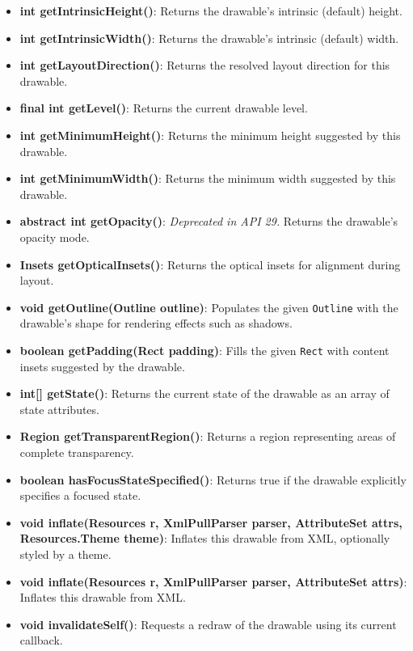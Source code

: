 \documentclass{report}
\begin{document}
\begin{itemize}
\begin{itemize}
                \item \textbf{int getIntrinsicHeight()}: Returns the drawable’s intrinsic (default) height.
                \item \textbf{int getIntrinsicWidth()}: Returns the drawable’s intrinsic (default) width.
                \item \textbf{int getLayoutDirection()}: Returns the resolved layout direction for this drawable.
                \item \textbf{final int getLevel()}: Returns the current drawable level.
                \item \textbf{int getMinimumHeight()}: Returns the minimum height suggested by this drawable.
                \item \textbf{int getMinimumWidth()}: Returns the minimum width suggested by this drawable.
                \item \textbf{abstract int getOpacity()}: \textit{Deprecated in API 29.} Returns the drawable’s opacity mode.
                \item \textbf{Insets getOpticalInsets()}: Returns the optical insets for alignment during layout.
                \item \textbf{void getOutline(Outline outline)}: Populates the given \texttt{Outline} with the drawable’s shape for rendering effects such as shadows.
                \item \textbf{boolean getPadding(Rect padding)}: Fills the given \texttt{Rect} with content insets suggested by the drawable.
                \item \textbf{int[] getState()}: Returns the current state of the drawable as an array of state attributes.
                \item \textbf{Region getTransparentRegion()}: Returns a region representing areas of complete transparency.
                \item \textbf{boolean hasFocusStateSpecified()}: Returns true if the drawable explicitly specifies a focused state.
                \item \textbf{void inflate(Resources r, XmlPullParser parser, AttributeSet attrs, Resources.Theme theme)}: Inflates this drawable from XML, optionally styled by a theme.
                \item \textbf{void inflate(Resources r, XmlPullParser parser, AttributeSet attrs)}: Inflates this drawable from XML.
                \item \textbf{void invalidateSelf()}: Requests a redraw of the drawable using its current callback.

\end{itemize}
\end{itemize}
\end{document}
